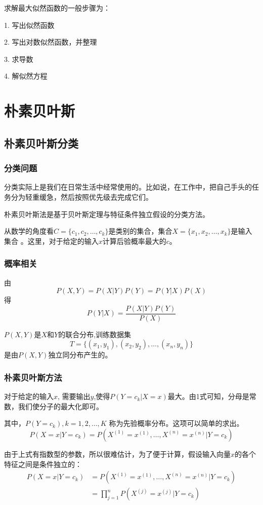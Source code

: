 \documentclass[a4paper,12pt]{book}
\begin{document}
    求解最大似然函数的一般步骤为：

    1. 写出似然函数


    2. 写出对数似然函数，并整理
    
    
    3. 求导数
    
    
    4. 解似然方程

    
    \chapter{朴素贝叶斯}
    \section{朴素贝叶斯分类}
    \subsection{分类问题}
    分类实际上是我们在日常生活中经常使用的。比如说，在工作中，把自己手头的任务分为轻重缓急，然后按照优先级去完成它们。
    
    朴素贝叶斯法是基于贝叶斯定理与特征条件独立假设的分类方法。
    
    从数学的角度看$C=\{c_1, c_2, \dots, c_k\}$是类别的集合，集合$X=\{x_1,x_2,\dots,x_k\}$是输入集合 。这里，对于给定的输入$x$计算后验概率最大的$c$。
    
    \subsection{概率相关}
    
    由
    $$P(X,Y)=P(X|Y)P(Y)=P(Y|X)P(X)
    $$
    得
    $$
    P(Y|X) = \frac{P(X|Y)P(Y)}{P(X)} 
    $$
    
    $P(X,Y)$是$X和Y$的联合分布,训练数据集
    $$
    T=\{(x_1,y_1),(x_2,y_2),\dots,(x_n,y_n)\}
    $$
    是由$P(X,Y)$独立同分布产生的。
    
    \subsection{朴素贝叶斯方法}
    对于给定的输入$x$, 需要输出$y$,使得$P(Y=c_k|X=x)$最大。由1式可知，分母是常数，我们使分子的最大化即可。
    
    其中，$P(Y=c_k), k=1, 2, \dots, K$ 称为先验概率分布。这项可以简单的求出。
    $$P(X=x|Y=c_k)=P(X^{(1)}=x^{(1)}, \dots, X^{(n)}=x^{(n)} |Y=c_k)$$
    
    由于上式有指数型的参数，所以很难估计，为了便于计算，假设输入向量$x$的各个特征之间是条件独立的：
    \begin{equation}
        \begin{aligned}
                P(X=x|Y=c_k)&=P(X^{(1)}=x^{(1)}, \dots, X^{(n)}=x^{(n)} |Y=c_k) \\
                &=\prod_{j=1}^nP(X^{(j)}=x^{(j)}|Y=c_k)
        \end{aligned}
    \end{equation}
    
\end{document}
